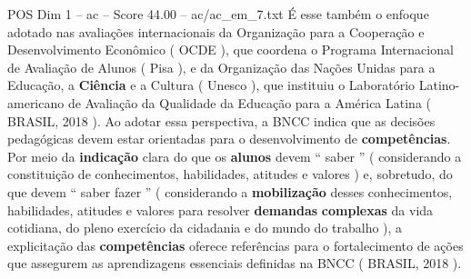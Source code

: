 \begin{textsample}{POS Dim 1 – ac – Score 44.00 – ac/ac\_em\_7.txt}
É esse também o enfoque adotado nas avaliações internacionais da Organização para a Cooperação e Desenvolvimento Econômico ( OCDE ), que coordena o Programa Internacional de Avaliação de Alunos ( Pisa ), e da Organização das Nações Unidas para a Educação, a \textbf{Ciência} e a Cultura ( Unesco ), que instituiu o Laboratório Latino-americano de Avaliação da Qualidade da Educação para a América Latina ( BRASIL, 2018 ).
Ao adotar essa perspectiva, a BNCC indica que as decisões pedagógicas devem estar orientadas para o desenvolvimento de \textbf{competências}.
Por meio da \textbf{indicação} clara do que os \textbf{alunos} devem “ saber ” ( considerando a constituição de conhecimentos, habilidades, atitudes e valores ) e, sobretudo, do que devem “ saber fazer ” ( considerando a \textbf{mobilização} desses conhecimentos, habilidades, atitudes e valores para resolver \textbf{demandas} \textbf{complexas} da vida cotidiana, do pleno exercício da cidadania e do mundo do trabalho ), a explicitação das \textbf{competências} oferece referências para o fortalecimento de ações que assegurem as aprendizagens essenciais definidas na BNCC ( BRASIL, 2018 ).

\end{textsample}
